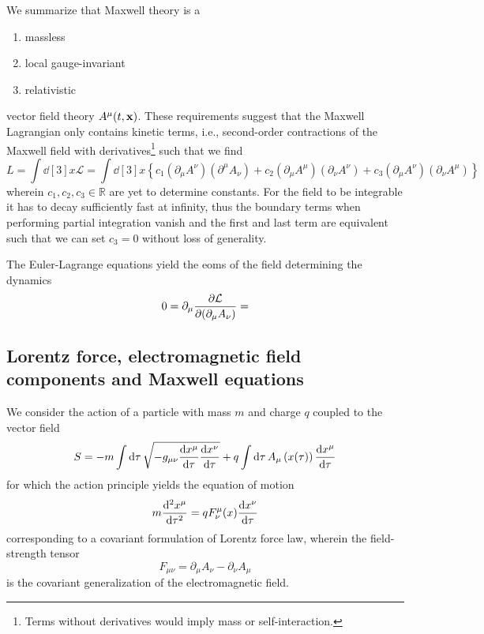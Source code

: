 We summarize that Maxwell theory is a
\begin{enumerate}
	\item massless
	\item local gauge-invariant
	\item relativistic	
\end{enumerate}
vector field theory $A^\mu(t,\vb{x})$.
These requirements suggest that the Maxwell Lagrangian only contains kinetic terms, i.e., second-order contractions of the Maxwell field with derivatives\footnote{Terms without derivatives would imply mass or self-interaction.}
such that we find
\begin{equation}
	L
	=
	\int\dd[3]{x}
	\mathcal{L}
	=
	\int\dd[3]{x}
	\left\{
		c_1
		\left(
			\partial_\mu
			A^\nu
		\right)
		\left(
			\partial^\mu
			A_\nu
		\right)
		+
		c_2
		\left(
			\partial_\mu
			A^\mu
		\right)
		\left(
			\partial_\nu
			A^\nu
		\right)
		+
		c_3
		\left(
			\partial_\mu
			A^\nu
		\right)
		\left(
			\partial_\nu
			A^\mu
		\right)
	\right\}
\end{equation}
wherein $c_1,c_2,c_3\in\mathbb{R}$ are yet to determine constants.
For the field to be integrable it has to decay sufficiently fast at infinity, thus the boundary terms when performing partial integration vanish and the first and last term are equivalent~\cite{deRham2014} such that we can set $c_3=0$ without loss of generality.

The Euler-Lagrange equations yield the \gls{eom}s of the field determining the dynamics
\begin{equation}
	0
	=
	\partial_\mu\pdv{\mathcal{L}}{(\partial_\mu A_\nu)}
	=
\end{equation}

\subsection{Lorentz force, electromagnetic field components and Maxwell equations}

We consider the action of a particle with mass $m$ and charge $q$ coupled to the vector field~\cite[p.~244]{Zee2013}
\begin{equation}
	S
	=
	-
	m\int\dd{\tau}
	\sqrt{-g_{\mu\nu}\dv{x^\mu}{\tau}\dv{x^\nu}{\tau}}
	+
	q\int\dd{\tau}
	A_\mu\left(x(\tau)\right)
	\dv{x^\mu}{\tau}
\end{equation}
for which the action principle yields the equation of motion
\begin{equation}
	m
	\dv[2]{x^\mu}{\tau}
	=
	qF^\mu_\nu(x)\dv{x^\nu}{\tau}
	\label{eq:cov_lorentz_force}
\end{equation}
corresponding to a covariant formulation of Lorentz force law, wherein the field-strength tensor
\begin{equation}
	F_{\mu\nu}
	=
	\partial_\mu
	A_\nu
	-
	\partial_\nu
	A_\mu
\end{equation}
is the covariant generalization of the electromagnetic field.

